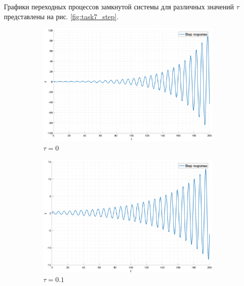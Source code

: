 Графики переходных процессов замкнутой системы для различных значений $\tau$ представлены на рис. \ref{fig:task7_step}.
\begin{figure}[ht!]
    \begin{subfigure}{0.5\textwidth}
        \centering
        \includegraphics[width=\textwidth]{media/plots/task7_step_response_closed_1.png}
        \caption{$\tau = 0$}
    \end{subfigure}
    \begin{subfigure}{0.5\textwidth}
        \centering
        \includegraphics[width=\textwidth]{media/plots/task7_step_response_closed_2.png}
        \caption{$\tau = 0.1$}
    \end{subfigure}
    \begin{subfigure}{0.5\textwidth}
        \centering

\end{subfigure}
\end{figure}
